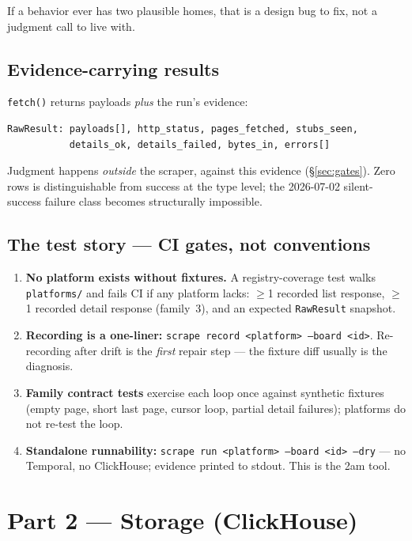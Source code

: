 \documentclass[11pt,a4paper]{article}
\newcommand{\gate}[1]{\textbf{\textcolor{red!60!black}{#1}}}
\begin{document}
If a behavior ever has two plausible homes, that is a design bug to fix, not a judgment call to live with.

\subsection{Evidence-carrying results}
\label{sec:evidence}
\texttt{fetch()} returns payloads \emph{plus} the run's evidence:
\begin{verbatim}
RawResult: payloads[], http_status, pages_fetched, stubs_seen,
           details_ok, details_failed, bytes_in, errors[]
\end{verbatim}
Judgment happens \emph{outside} the scraper, against this evidence (\S\ref{sec:gates}). Zero rows is
distinguishable from success at the type level; the 2026-07-02 silent-success failure class becomes
structurally impossible.

\subsection{The test story --- CI gates, not conventions}
\label{sec:tests}
\begin{enumerate}
\item \gate{No platform exists without fixtures.} A registry-coverage test walks \texttt{platforms/} and
fails CI if any platform lacks: $\geq$1 recorded list response, $\geq$1 recorded detail response (family~3),
and an expected \texttt{RawResult} snapshot.
\item \textbf{Recording is a one-liner:} \texttt{scrape record <platform> --board <id>}. Re-recording after
drift is the \emph{first} repair step --- the fixture diff usually is the diagnosis.
\item \textbf{Family contract tests} exercise each loop once against synthetic fixtures (empty page, short
last page, cursor loop, partial detail failures); platforms do not re-test the loop.
\item \textbf{Standalone runnability:} \texttt{scrape run <platform> --board <id> --dry} --- no Temporal, no
ClickHouse; evidence printed to stdout. This is the 2am tool.
\end{enumerate}

\section{Part 2 --- Storage (ClickHouse)}
\label{sec:storage}
\end{document}
